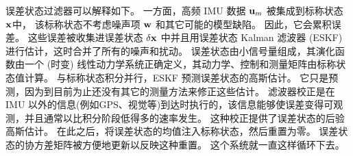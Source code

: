 误差状态过滤器可以解释如下。 
一方面，高频 IMU 数据 ${\bf u}_m$ 被集成到标称状态 ${\bf x}$中， 
该标称状态不考虑噪声项 ${\bf w}$ 和其它可能的模型缺陷。 
因此，它会累积误差。 
这些误差被收集进误差状态 $\delta{\bf x}$ 中并且用误差状态 Kalman 滤波器 (ESKF)进行估计，这时合并了所有的噪声和扰动。 
误差状态由小信号量组成，其演化函数由一个 (时变) 线性动力学系统正确定义，其动力学、控制和测量矩阵由标称状态值计算。 
与标称状态积分并行，ESKF 预测误差状态的高斯估计。 
它只是预测，因为到目前为止还没有其它的测量方法来修正这些估计。 
滤波器校正是在 IMU 以外的信息(例如GPS、视觉等)到达时执行的，该信息能够使误差变得可观测，并且通常以比积分阶段低得多的速率发生。 
这种校正提供了误差状态的后验高斯估计。 
在此之后，将误差状态的均值注入标称状态，然后重置为零。 
误差状态的协方差矩阵被方便地更新以反映这种重置。 
这个系统就一直这样循环下去。

